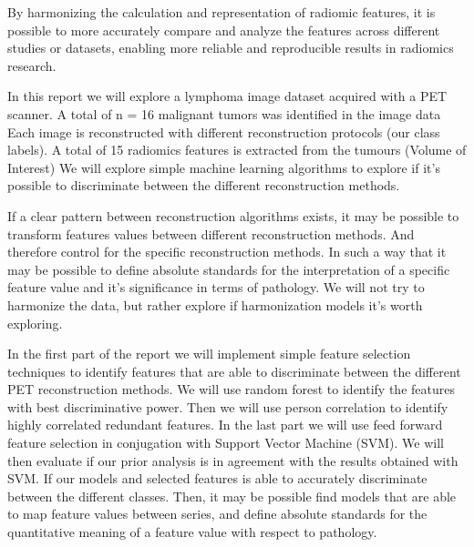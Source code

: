 
By harmonizing the calculation and representation of radiomic features, it is
possible to more accurately compare and analyze the features across different
studies or datasets, enabling more reliable and reproducible results in
radiomics research.



In this report we will explore a lymphoma image dataset acquired with a PET %
scanner. A total of n = 16 malignant tumors was identified in the image data 
Each image is reconstructed with different reconstruction protocols (our class
labels). A total of 15 radiomics features is extracted from the tumours (Volume
of Interest) 
We will explore simple machine learning algorithms to explore if it's possible
to discriminate between the different reconstruction methods. 

If a clear pattern between reconstruction algorithms exists, it may be possible to
transform features values between different reconstruction methods. And
therefore control for the specific reconstruction methods. In such a way that
it may be possible to define absolute standards for the interpretation of a specific
feature value and it's significance in terms of pathology. We will not try to
harmonize the data, but rather explore if harmonization models it's worth
exploring.  


In the first part of the report we will implement simple feature selection
techniques to identify features that are able to discriminate between the
different PET reconstruction methods. We will use random forest to identify the
features with best discriminative power. Then we will use person correlation to
identify highly correlated redundant features. In the last part we will
use feed forward feature selection in conjugation with Support Vector Machine
(SVM). We will then evaluate if our prior analysis is in agreement with the
results obtained with SVM. If our models and selected features is able to
accurately discriminate between the different classes. Then, it may be possible
find models that are able to map feature values between series, and define
absolute standards for the quantitative meaning of a feature value with respect
to pathology. 

